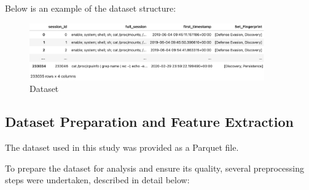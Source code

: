         Below is an example of the dataset structure:

        \begin{figure}[h!]
            \centering
            \includegraphics[width=0.9\textwidth]{figures/others/dataset_1.png}
            \vspace{-1em}
            \caption{Dataset}
            \label{fig:dataset_example}
        \end{figure}

    \vspace{-1em}

    \subsection{Dataset Preparation and Feature Extraction}

        The dataset used in this study was provided as a Parquet file. %


        To prepare the dataset for analysis and ensure its quality, several preprocessing steps were undertaken, described in detail below:


